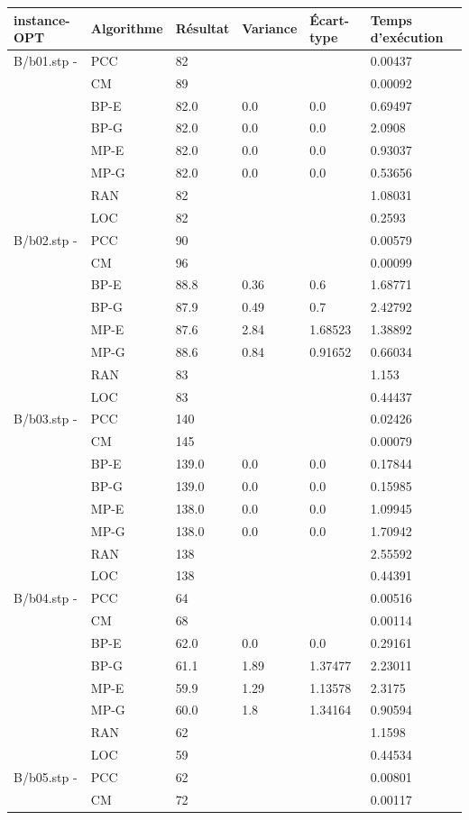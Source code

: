 \documentclass[12pt,a4paper]{article}
\begin{document}
\begin{center}
	\begin{tabular}{l|l|l|l|l|l}
		instance-OPT & Algorithme & Résultat & Variance & Écart-type & Temps d'exécution\\ \hline \hline
		B/b01.stp - &PCC&82&&&0.00437\\
		&CM&89&&&0.00092\\
		&BP-E&82.0&0.0&0.0&0.69497\\
		&BP-G&82.0&0.0&0.0&2.0908\\
		&MP-E&82.0&0.0&0.0&0.93037\\&MP-G&82.0&0.0&0.0&0.53656\\
		&RAN&82&&&1.08031\\
		&LOC&82&&&0.2593\\\hline
		B/b02.stp - &PCC&90&&&0.00579\\
		&CM&96&&&0.00099\\
		&BP-E&88.8&0.36&0.6&1.68771\\
		&BP-G&87.9&0.49&0.7&2.42792\\
		&MP-E&87.6&2.84&1.68523&1.38892\\&MP-G&88.6&0.84&0.91652&0.66034\\
		&RAN&83&&&1.153\\
		&LOC&83&&&0.44437\\\hline
		B/b03.stp - &PCC&140&&&0.02426\\
		&CM&145&&&0.00079\\
		&BP-E&139.0&0.0&0.0&0.17844\\
		&BP-G&139.0&0.0&0.0&0.15985\\
		&MP-E&138.0&0.0&0.0&1.09945\\&MP-G&138.0&0.0&0.0&1.70942\\
		&RAN&138&&&2.55592\\
		&LOC&138&&&0.44391\\\hline
		B/b04.stp - &PCC&64&&&0.00516\\
		&CM&68&&&0.00114\\
		&BP-E&62.0&0.0&0.0&0.29161\\
		&BP-G&61.1&1.89&1.37477&2.23011\\
		&MP-E&59.9&1.29&1.13578&2.3175\\&MP-G&60.0&1.8&1.34164&0.90594\\
		&RAN&62&&&1.1598\\
		&LOC&59&&&0.44534\\\hline
		B/b05.stp - &PCC&62&&&0.00801\\
		&CM&72&&&0.00117\\

\end{tabular}
\end{center}
\end{document}
